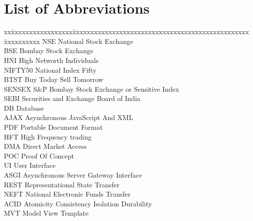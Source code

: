 
\chapter*{List of Abbreviations}
\thispagestyle{empty}
\begin{tabbing}
xx\=xxxxxxxxxxxxxxxxx\=xxxxxxxxxxxxxxxxxxxxxxxxxxxxxxxxxxxxxxxxxxxxxxxxx\=xxxxxxxxxx\kill
\>NSE \> National Stock Exchange \\
\>BSE \> Bombay Stock Exchange\\
\>HNI \>  High Networth Individuals\\
\>NIFTY50 \>  National Index Fifty\\
\>BTST \>  Buy Today Sell Tomorrow\\
\>SENSEX \> S\&P Bombay Stock Exchange or Sensitive Index\\
\> SEBI \> Securities and Exchange Board of India\\
\> DB \> Database\\
\> AJAX \> Asynchronous JavaScript And XML\\
\> PDF \> Portable Document Format\\
\>  HFT    \> High Frequency trading \\
\>  DMA   \>  Direct Market Access \\
\>  POC    \> Proof Of Concept \\
\>  UI    \> User Interface \\
\>  ASGI    \> Asynchronous Server Gateway Interface \\
\>  REST    \> Representational State Transfer \\
\>  NEFT    \> National Electronic Funds Transfer \\
\>ACID \> Atomicity Consistency Isolation Durability\\
\>MVT \> Model View Template\\
\end{tabbing}



